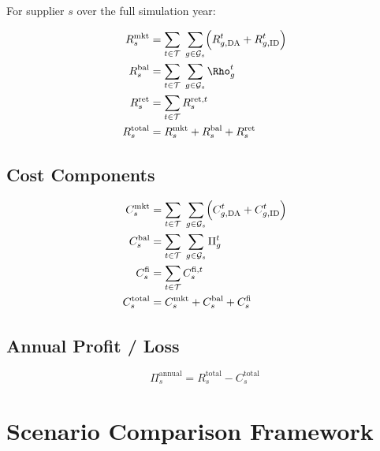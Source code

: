 \documentclass[12pt,a4paper]{article}
\begin{document}
For supplier $s$ over the full simulation year:

\begin{align}
R_{s}^{\mathrm{mkt}} &= \sum_{t \in \mathcal{T}}\;\sum_{g \in \mathcal{G}_{s}}
  \Bigl(R_{g,\mathrm{DA}}^{t} + R_{g,\mathrm{ID}}^{t}\Bigr)
  \label{eq:rev_mkt}\\
R_{s}^{\mathrm{bal}} &= \sum_{t \in \mathcal{T}}\;\sum_{g \in \mathcal{G}_{s}}
  \Rho_{g}^{t}
  \label{eq:rev_bal}\\
R_{s}^{\mathrm{ret}} &= \sum_{t \in \mathcal{T}} R_{s}^{\mathrm{ret},t}
  \label{eq:rev_ret}\\
R_{s}^{\mathrm{total}} &= R_{s}^{\mathrm{mkt}} + R_{s}^{\mathrm{bal}}
  + R_{s}^{\mathrm{ret}}
  \label{eq:rev_total}
\end{align}

\subsection{Cost Components}

\begin{align}
C_{s}^{\mathrm{mkt}} &= \sum_{t \in \mathcal{T}}\;\sum_{g \in \mathcal{G}_{s}}
  \Bigl(C_{g,\mathrm{DA}}^{t} + C_{g,\mathrm{ID}}^{t}\Bigr)
  \label{eq:cost_mkt}\\
C_{s}^{\mathrm{bal}} &= \sum_{t \in \mathcal{T}}\;\sum_{g \in \mathcal{G}_{s}}
  \Pi_{g}^{t}
  \label{eq:cost_bal}\\
C_{s}^{\mathrm{fi}}  &= \sum_{t \in \mathcal{T}} C_{s}^{\mathrm{fi},t}
  \label{eq:cost_fi}\\
C_{s}^{\mathrm{total}} &= C_{s}^{\mathrm{mkt}} + C_{s}^{\mathrm{bal}}
  + C_{s}^{\mathrm{fi}}
  \label{eq:cost_total}
\end{align}

\subsection{Annual Profit / Loss}

\begin{equation}
\Pi_{s}^{\mathrm{annual}} = R_{s}^{\mathrm{total}} - C_{s}^{\mathrm{total}}
\label{eq:pl}
\end{equation}

\section{Scenario Comparison Framework}
\end{document}
